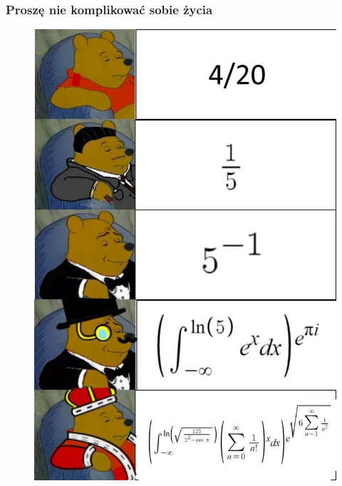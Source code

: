 \documentclass[10pt,t]{beamer}
\begin{document}
\begin{frame}
  \frametitle{Proszę nie komplikować sobie życia}


  \begin{figure}

    \centering


    \includegraphics[scale=0.19]
    {./PresentationsPictures/Dont-complicate-your-life-01.jpg}

  \end{figure}

\end{frame}
\end{document}

